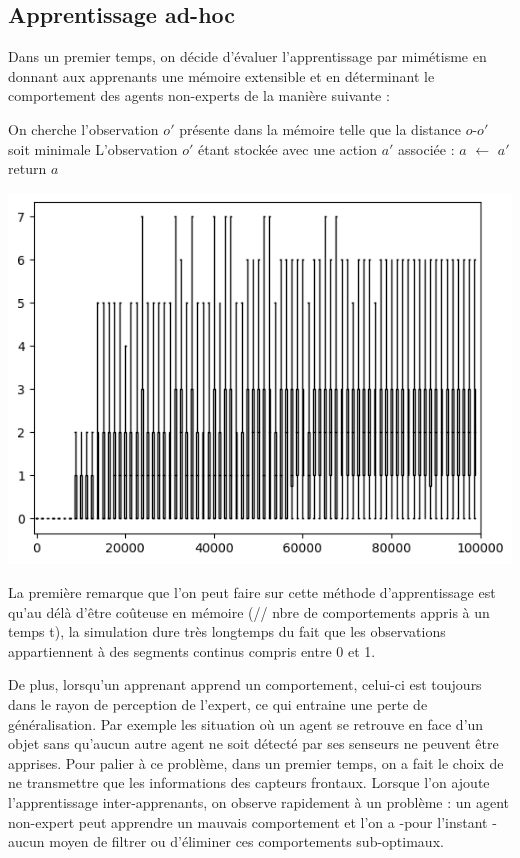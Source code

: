 \documentclass[a4paper, 12pt]{report}
\begin{document}
	\subsection{Apprentissage ad-hoc}
	Dans un premier temps, on décide d'évaluer l'apprentissage par mimétisme en donnant aux apprenants une mémoire extensible et en déterminant le comportement des agents non-experts de la manière suivante :
	

	\begin{algorithm}[H]
		\;
  		On cherche l'observation $o'$ présente dans la mémoire telle que la distance $o$-$o'$ soit minimale\;
		L'observation $o'$ étant stockée avec une action $a'$ associée : $a$ $\leftarrow$ $a'$ \;
  		return $a$\;
	\end{algorithm}
	
\includegraphics{learner_boxplot}
	
	La première remarque que l'on peut faire sur cette méthode d'apprentissage est qu'au délà d'être coûteuse en mémoire (// nbre de comportements appris à un temps t), la simulation dure très longtemps du fait que les observations appartiennent à des segments continus compris entre 0 et 1.
	
	De plus, lorsqu'un apprenant apprend un comportement, celui-ci est toujours dans le rayon de perception de l'expert, ce qui entraine une perte de généralisation. Par exemple les situation où un agent se retrouve en face d'un objet sans qu'aucun autre agent ne soit détecté par ses senseurs ne peuvent être apprises.
	Pour palier à ce problème, dans un premier temps, on a fait le choix de ne transmettre que les informations des capteurs frontaux.
	Lorsque l'on ajoute l'apprentissage inter-apprenants, on observe rapidement à un problème : un agent non-expert peut apprendre un mauvais comportement et l'on a -pour l'instant - aucun moyen de filtrer ou d'éliminer ces comportements sub-optimaux.
	
\end{document}
